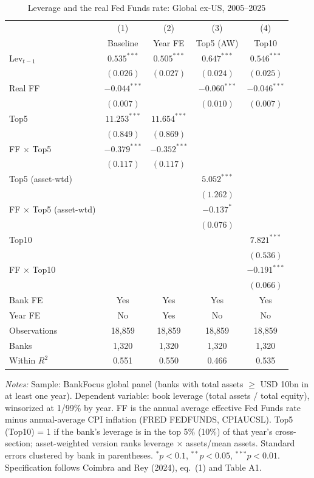 \begin{table}[htbp]
\centering
\small
\begin{threeparttable}
\caption{Leverage and the real Fed Funds rate: Global ex-US, 2005--2025}
\label{tab:cr_eq1_4}
\begin{tabular}{lcccc}
\toprule
 & (1) & (2) & (3) & (4) \\
 & Baseline & Year FE & Top5 (AW) & Top10 \\
\midrule
Lev$_{t-1}$ & $0.535^{***}$ & $0.505^{***}$ & $0.647^{***}$ & $0.546^{***}$ \\
 & $(0.026)$ & $(0.027)$ & $(0.024)$ & $(0.025)$ \\[2pt]
Real FF & $-0.044^{***}$ &  & $-0.060^{***}$ & $-0.046^{***}$ \\
 & $(0.007)$ &  & $(0.010)$ & $(0.007)$ \\[2pt]
Top5 & $11.253^{***}$ & $11.654^{***}$ &  &  \\
 & $(0.849)$ & $(0.869)$ &  &  \\[2pt]
FF $\times$ Top5 & $-0.379^{***}$ & $-0.352^{***}$ &  &  \\
 & $(0.117)$ & $(0.117)$ &  &  \\[2pt]
Top5 (asset-wtd) &  &  & $5.052^{***}$ &  \\
 &  &  & $(1.262)$ &  \\[2pt]
FF $\times$ Top5 (asset-wtd) &  &  & $-0.137^{*}$ &  \\
 &  &  & $(0.076)$ &  \\[2pt]
Top10 &  &  &  & $7.821^{***}$ \\
 &  &  &  & $(0.536)$ \\[2pt]
FF $\times$ Top10 &  &  &  & $-0.191^{***}$ \\
 &  &  &  & $(0.066)$ \\
\midrule
Bank FE & Yes & Yes & Yes & Yes \\
Year FE & No & Yes & No & No \\
Observations & 18,859 & 18,859 & 18,859 & 18,859 \\
Banks & 1,320 & 1,320 & 1,320 & 1,320 \\
Within $R^2$ & 0.551 & 0.550 & 0.466 & 0.535 \\
\bottomrule
\end{tabular}
\begin{tablenotes}[flushleft]
\footnotesize
\item \textit{Notes:} Sample: BankFocus global panel (banks with total assets $\geq$ USD 10bn in at least one year). Dependent variable: book leverage (total assets / total equity), winsorized at 1/99\% by year. FF is the annual average effective Fed Funds rate minus annual-average CPI inflation (FRED FEDFUNDS, CPIAUCSL). Top5 (Top10) = 1 if the bank's leverage is in the top 5\% (10\%) of that year's cross-section; asset-weighted version ranks leverage $\times$ assets/mean assets. Standard errors clustered by bank in parentheses. $^{*}p<0.1$, $^{**}p<0.05$, $^{***}p<0.01$. Specification follows Coimbra and Rey (2024), eq.~(1) and Table A1.
\end{tablenotes}
\end{threeparttable}
\end{table}
